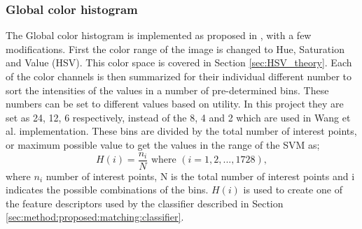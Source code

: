 \subsubsection{Global color histogram}
\label{sec:meth:featextr:gch}

The Global color histogram is implemented as proposed in \cite{wang2015new}, with a few modifications. First the color range of the image is changed to Hue, Saturation and Value (HSV). This color space is covered in Section \ref{sec:HSV_theory}. Each of the color channels is then summarized for their individual different number to sort the intensities of the values in a number of pre-determined bins. These numbers can be set to different values based on utility. In this project they are set as 24, 12, 6 respectively, instead of the 8, 4 and 2 which are used in Wang et al. implementation. These bins are divided by the total number of interest points, or maximum possible value to get the values in the range of the SVM as;
\begin{equation}
H(i) = \frac{n_i}{N} \mbox{ where } (i = 1, 2, ..., 1728),
\end{equation}
where $n_i$ number of interest points, N is the total number of interest points and i indicates the possible combinations of the bins. $H(i)$ is used to create one of the feature descriptors used by the classifier described in Section \ref{sec:method:proposed:matching:classifier}.


